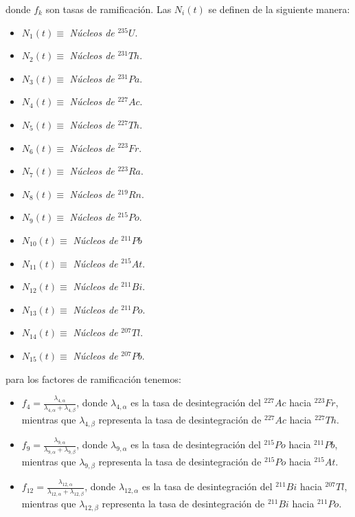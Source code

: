 \noindent donde $f_k$ son tasas de ramificación. Las $N_i(t)$ se definen de la siguiente manera:
\begin{itemize}
    \item $N_1(t)\equiv$ \textit{Núcleos de} $^{235}U$.
    \item $N_2(t)\equiv$ \textit{Núcleos de} $^{231}Th$.
    \item $N_3(t)\equiv$ \textit{Núcleos de} $^{231}Pa$.
    \item $N_4(t)\equiv$ \textit{Núcleos de} $^{227}Ac$.
    \item $N_5(t)\equiv$ \textit{Núcleos de} $^{227}Th$.
    \item $N_6(t)\equiv$ \textit{Núcleos de} $^{223}Fr$.
    \item $N_7(t)\equiv$ \textit{Núcleos de} $^{223}Ra$.
    \item $N_8(t)\equiv$ \textit{Núcleos de} $^{219}Rn$.
    \item $N_9(t)\equiv$ \textit{Núcleos de} $^{215}Po$.
    \item $N_{10}(t)\equiv$ \textit{Núcleos de} $^{211}Pb$
    \item $N_{11}(t)\equiv$ \textit{Núcleos de} $^{215}At$.
    \item $N_{12}(t)\equiv$ \textit{Núcleos de} $^{211}Bi$.
    \item $N_{13}(t)\equiv$ \textit{Núcleos de} $^{211}Po$.
    \item $N_{14}(t)\equiv$ \textit{Núcleos de} $^{207}Tl$.
    \item $N_{15}(t)\equiv$ \textit{Núcleos de} $^{207}Pb$.
\end{itemize}

\noindent para los factores de ramificación tenemos:
\begin{itemize}
    \item $f_4=\frac{\lambda_{4,\alpha}}{\lambda_{4,\alpha}+\lambda_{4,\beta}}$, donde $\lambda_{4,\alpha}$ es la tasa de desintegración del $^{227}Ac$ hacia $^{223}Fr$, mientras que $\lambda_{4,\beta}$ representa la tasa de desintegración de $^{227}Ac$ hacia $^{227}Th$. 
    \item $f_9=\frac{\lambda_{9,\alpha}}{\lambda_{9,\alpha}+\lambda_{9,\beta}}$, donde $\lambda_{9,\alpha}$ es la tasa de desintegración del $^{215}Po$ hacia $^{211}Pb$, mientras que $\lambda_{9,\beta}$ representa la tasa de desintegración de $^{215}Po$ hacia $^{215}At$.
    \item $f_{12}=\frac{\lambda_{12,\alpha}}{\lambda_{12,\alpha}+\lambda_{12,\beta}}$, donde $\lambda_{12,\alpha}$ es la tasa de desintegración del $^{211} Bi$ hacia $^{207} Tl$, mientras que $\lambda_{12,\beta}$ representa la tasa de desintegración de $^{211} Bi$ hacia $^{211} Po$.
\end{itemize}

